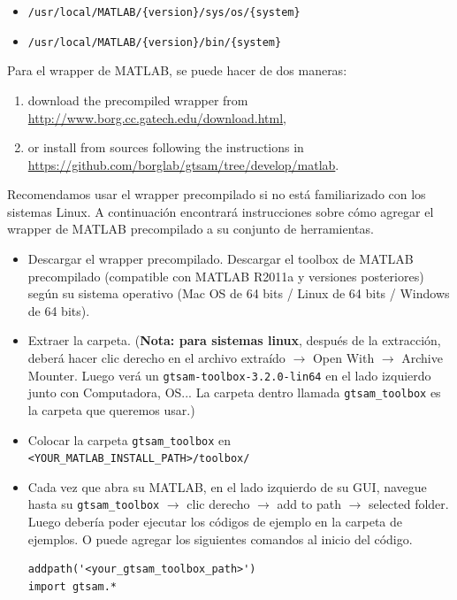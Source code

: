 \documentclass[tp]{lcc}
\begin{document}
\begin{itemize}
    \item \lstinline[style=bash]|/usr/local/MATLAB/{version}/sys/os/{system}|
    \item \lstinline[style=bash]|/usr/local/MATLAB/{version}/bin/{system}|
\end{itemize}

Para el wrapper de MATLAB, se puede hacer de dos maneras:

\begin{enumerate}
    \item download the precompiled wrapper from \url{http://www.borg.cc.gatech.edu/download.html},
    \item or install from sources following the instructions in \url{https://github.com/borglab/gtsam/tree/develop/matlab}.
\end{enumerate}

Recomendamos usar el wrapper precompilado si no está familiarizado con los sistemas Linux. A continuación encontrará instrucciones sobre cómo agregar el wrapper de MATLAB precompilado a su conjunto de herramientas.

\begin{itemize}
    \item Descargar el wrapper precompilado. Descargar el toolbox de MATLAB precompilado (compatible con MATLAB R2011a y versiones posteriores) según su sistema operativo (Mac OS de 64 bits / Linux de 64 bits / Windows de 64 bits).
    \item Extraer la carpeta. (\textbf{Nota: para sistemas linux}, después de la extracción, deberá hacer clic derecho en el archivo extraído $\rightarrow$ Open With $\rightarrow$ Archive Mounter. Luego verá un \lstinline[style=bash]{gtsam-toolbox-3.2.0-lin64} en el lado izquierdo junto con Computadora, OS... La carpeta dentro llamada \lstinline[style=bash]{gtsam_toolbox} es la carpeta que queremos usar.)
    \item Colocar la carpeta \lstinline[style=bash]{gtsam_toolbox} en \lstinline[style=bash]{<YOUR_MATLAB_INSTALL_PATH>/toolbox/}
    \item Cada vez que abra su MATLAB, en el lado izquierdo de su GUI, navegue hasta su \lstinline[style=bash]{gtsam_toolbox} $\rightarrow$ clic derecho $\rightarrow$ add to path $\rightarrow$ selected folder. Luego debería poder ejecutar los códigos de ejemplo en la carpeta de ejemplos. O puede agregar los siguientes comandos al inicio del código.
    \begin{lstlisting}[style=bash]
addpath('<your_gtsam_toolbox_path>')
import gtsam.*
    \end{lstlisting}
\end{itemize}
\end{document}
